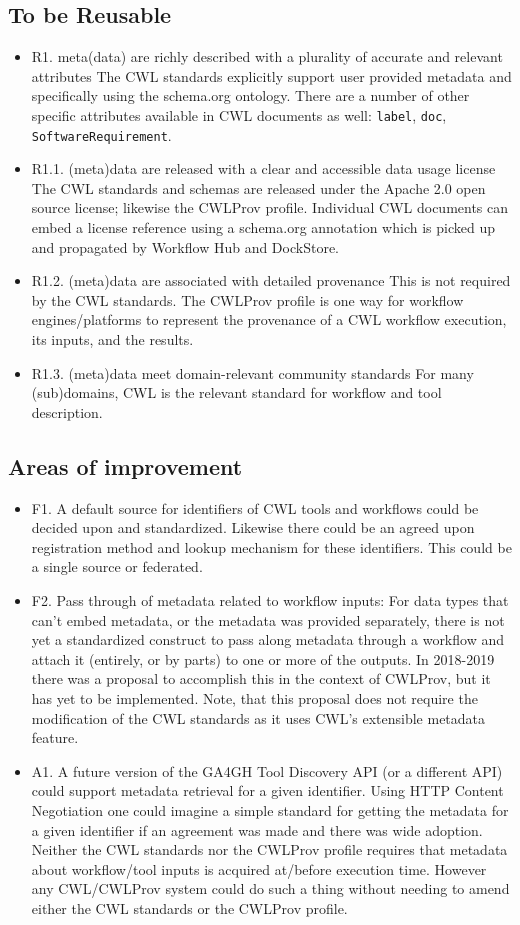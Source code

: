 \subsection{To be Reusable}
\begin{itemize}
\item R1. meta(data) are richly described with a plurality of accurate and relevant attributes
The CWL standards explicitly support user provided metadata and specifically using the schema.org ontology. There are a number of other specific attributes available in CWL documents as well: \verb|label|, \verb|doc|, \verb|SoftwareRequirement|.
\item R1.1. (meta)data are released with a clear and accessible data usage license
The CWL standards and schemas are released under the Apache 2.0 open source license; likewise the CWLProv profile. Individual CWL documents can embed a license reference using a schema.org annotation which is picked up and propagated by Workflow Hub and DockStore.
\item R1.2. (meta)data are associated with detailed provenance
This is not required by the CWL standards. The CWLProv profile is one way for workflow engines/platforms to represent the provenance of a CWL workflow execution, its inputs, and the results.
\item R1.3. (meta)data meet domain-relevant community standards
For many (sub)domains, CWL is the relevant standard for workflow and tool description.
\end{itemize}
\subsection{Areas of improvement}
\begin{itemize}
\item F1. A default source for identifiers of CWL tools and workflows could be decided upon and standardized. Likewise there could be an agreed upon registration method and lookup mechanism for these identifiers. This could be a single source or federated.
\item F2. Pass through of metadata related to workflow inputs: For data types that can’t embed metadata, or the metadata was provided separately, there is not yet a standardized construct to pass along metadata through a workflow and attach it (entirely, or by parts) to one or more of the outputs.  In 2018-2019 there was a proposal to accomplish this in the context of CWLProv, but it has yet to be implemented. Note, that this proposal does not require the modification of the CWL standards as it uses CWL’s extensible metadata feature.
\item A1. A future version of the GA4GH Tool Discovery API (or a different API) could support metadata retrieval for a given identifier. Using HTTP Content Negotiation one could imagine a simple standard for getting the metadata for a given identifier if an agreement was made and there was wide adoption.
Neither the CWL standards nor the CWLProv profile requires that metadata about workflow/tool inputs is acquired at/before execution time. However any CWL/CWLProv system could do such a thing without needing to amend either the CWL standards or the CWLProv profile.
\end{itemize}
